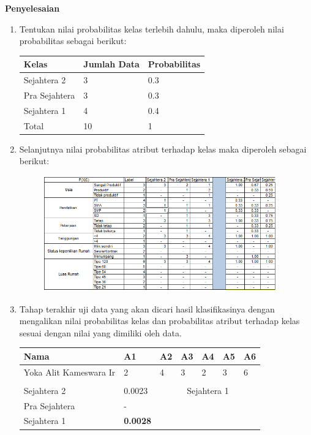 \pagebreak
\par \textbf{Penyelesaian}
\begin{enumerate}
    \item Tentukan nilai probabilitas kelas terlebih dahulu, maka diperoleh nilai probabilitas sebagai berikut:
    \begin{table}[!ht]
    \centering
\begin{tabular}{|l|l|l|}
\hline
Kelas         & Jumlah Data & Probabilitas \\ \hline
Sejahtera 2   & 3           & 0.3          \\ \hline
Pra Sejahtera & 3           & 0.3          \\ \hline
Sejahtera 1   & 4           & 0.4          \\ \hline
Total         & 10          & 1            \\ \hline
\end{tabular}
\end{table}
\item Selanjutnya nilai probabilitas atribut terhadap kelas maka diperoleh sebagai berikut:
\begin{figure}[!htpb]
        \centering
        \includegraphics[width=10cm, height=5cm]{figures/probailitas.PNG}
        \end{figure} 
\item Tahap terakhir uji data yang akan dicari hasil klasifikasinya dengan mengalikan nilai probabilitas kelas dan probabilitas atribut terhadap kelas sesuai dengan nilai yang dimiliki oleh data.
\begin{table}[!ht]
\centering
\begin{tabular}{|l|l|c|l|l|l|l|}
\hline
Nama                   & A1              & \multicolumn{1}{l|}{A2}   & A3  & A4  & A5  & A6  \\ \hline
Yoka Alit Kameswara Ir & 2               & \multicolumn{1}{l|}{4}    & 3   & 2   & 3   & 6   \\ \hline
\multicolumn{7}{|l|}{}                                                                       \\ \hline
Sejahtera 2            & 0.0023          & \multicolumn{5}{c|}{\multirow{}{}{Sejahtera 1}} \\ \cline{1-2}
Pra Sejahtera          & -               & \multicolumn{5}{c|}{}                             \\ \cline{1-2}
Sejahtera 1            & \textbf{0.0028} & \multicolumn{5}{c|}{}                             \\ \hline
\end{tabular}
\end{table}
\end{enumerate}
